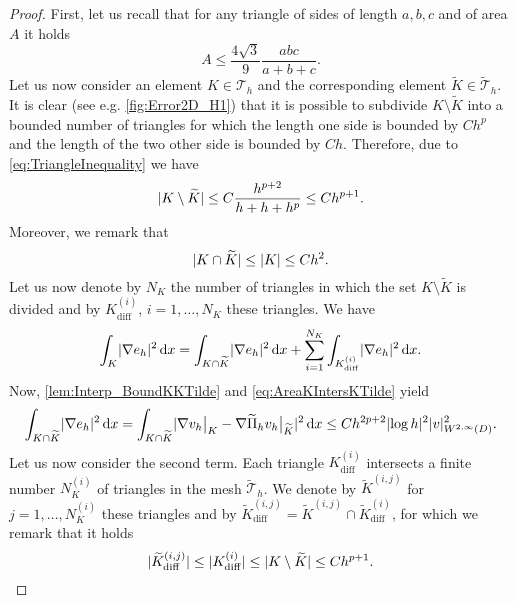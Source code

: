 \documentclass[10pt]{article}
\begin{document}
\begin{proof} First, let us recall that for any triangle of sides of length $a, b, c$ and of area $A$ it holds \cite{CuB67}
	\begin{equation}\label{eq:TriangleInequality}
		A \leq \frac{4\sqrt{3}}{9} \frac{abc}{a+b+c}.
	\end{equation}
	Let us now consider an element $K \in \mathcal T_h$ and the corresponding element $\widetilde K \in \widetilde{\mathcal T}_h$. It is clear (see e.g. \cref{fig:Error2D_H1}) that it is possible to subdivide $K \setminus \widetilde K$ into a bounded number of triangles for which the length one side is bounded by $Ch^p$ and the length of the two other side is bounded by $Ch$. Therefore, due to \eqref{eq:TriangleInequality} we have
	\begin{equation}\label{eq:AreaKMinusKTilde}
		\lvert K \setminus \widetilde K\rvert \leq C \frac{h^{p+2}}{h + h + h^p} \leq Ch^{p+1}.
	\end{equation}
	Moreover, we remark that
	\begin{equation}\label{eq:AreaKIntersKTilde}
		\lvert K \cap \widetilde K\rvert \leq \lvert K\rvert \leq Ch^2.
	\end{equation}
	Let us now denote by $N_K$ the number of triangles in which the set $K\setminus \widetilde K$ is divided and by $K_{\mathrm{diff}}^{(i)}$, $i= 1, \ldots, N_K$ these triangles. We have
	\begin{equation}
		\int_K \lvert\nabla e_h\rvert^2 \, \mathrm{d} x = \int_{K \cap \widetilde K} \lvert\nabla  e_h\rvert^2 \, \mathrm{d} x+ \sum_{i=1}^{N_K} \int_{K_{\mathrm{diff}}^{(i)}}\lvert\nabla  e_h\rvert^2 \, \mathrm{d} x.
	\end{equation}
	Now, \cref{lem:Interp_BoundKKTilde} and \eqref{eq:AreaKIntersKTilde} yield
	\begin{equation}\label{eq:IntegralKIntersKTilde}
		\int_{K \cap \widetilde K} \lvert\nabla  e_h\rvert^2 \, \mathrm{d} x = \int_{K \cap \widetilde K} \lvert\nabla v_h\bigr\rvert_{K} - \nabla \widetilde \Pi_h v_h \bigr\rvert_{\widetilde K}\rvert^2 \, \mathrm{d} x \leq C h^{2p+2} \lvert\log h\rvert^2 \lvert v\rvert_{W^{2, \infty}(D)}^2.
	\end{equation}
	Let us now consider the second term. Each triangle $K_{\mathrm{diff}}^{(i)}$ intersects a finite number $N_K^{(i)}$ of triangles in the mesh $\widetilde{\mathcal T}_h$. We denote by $\widetilde K^{(i,j)}$ for $j = 1, \ldots, N_K^{(i)}$ these triangles and by $\widetilde K^{(i,j)}_{\mathrm{diff}} = \widetilde K^{(i,j)} \cap \widetilde K^{(i)}_{\mathrm{diff}}$, for which we remark that it holds
	\begin{equation}
		\abs{\widetilde K_{\mathrm{diff}}^{(i,j)}}\leq\abs{K_{\mathrm{diff}}^{(i)}}\leq\abs{K\setminus\widetilde K} \leq Ch^{p+1}.

\end{equation}
\end{proof}
\end{document}
